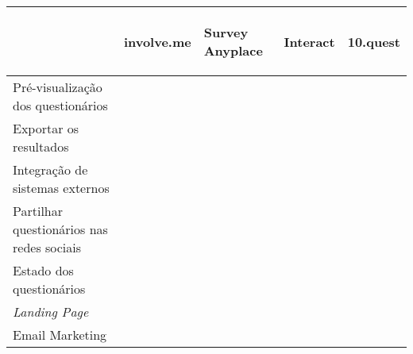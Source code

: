 \renewcommand{\arraystretch}{2}
\setlength\arrayrulewidth{1pt}
\begin{table}[!ht]  
	\begin{center}
		\begin{tabular}{|p{4cm}|p{0.1cm}|p{0.1cm}|p{0.1cm}|p{0.1cm}|}
			\cline{2-5}
			\multicolumn{1}{c|}{} & \hspace{0.2cm}\begin{sideways}involve.me\end{sideways} & \hspace{0.4cm}\begin{sideways}Survey Anyplace\end{sideways} & \hspace{0.2cm}\begin{sideways}Interact\end{sideways} &\hspace{0.2cm}\begin{sideways} 10.quest\end{sideways}\\ \hline
			
					
			Pré-visualização dos questionários &\cellcolor{green!80}  & \cellcolor{green!80} & \cellcolor{green!80} & \cellcolor{green!80}  \\ \hline
			
			Exportar os resultados &\cellcolor{green!80}  & \cellcolor{green!80} & \cellcolor{green!80} & \cellcolor{green!80}  \\ \hline
			
			Integração de sistemas externos & \cellcolor{green!80}  & \cellcolor{green!80} & \cellcolor{green!80} & \cellcolor{red!80}  \\ \hline
			
			Partilhar questionários nas redes sociais &\cellcolor{green!80}  & \cellcolor{yellow!80} & \cellcolor{green!80} & \cellcolor{green!80}  \\ \hline
			
			Estado dos questionários &\cellcolor{green!80}  & \cellcolor{red!80} & \cellcolor{red!80} & \cellcolor{green!80}  \\ \hline
			
			\textit{Landing Page}  &\cellcolor{red!80}  & \cellcolor{red!80} & \cellcolor{green!80} & \cellcolor{green!80}  \\ \hline
			
			Email Marketing &\cellcolor{red!80}  & \cellcolor{green!80} & \cellcolor{green!80} & \cellcolor{green!80}  \\ \hline
			

\end{tabular}
\end{center}
\end{table}
